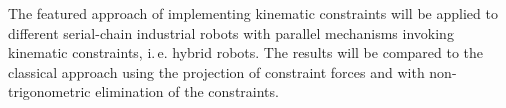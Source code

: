 \documentclass[twocolumn,10pt]{IFTOMM}
\begin{document}
The featured approach of implementing kinematic constraints will be applied to different serial-chain industrial robots with parallel mechanisms invoking kinematic constraints, i.\,e. hybrid robots. 
The results will be compared to the classical approach using the projection of constraint forces and with non-trigonometric elimination of the constraints.








%





\renewcommand{\baselinestretch}{0.92}


\end{document}
